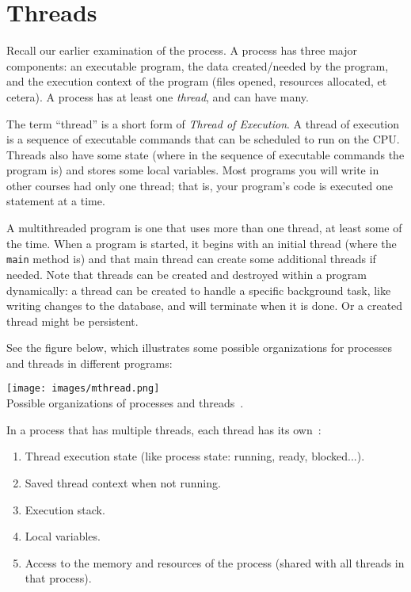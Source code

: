 




\section*{Threads}

Recall our earlier examination of the process. A process has three major components: an executable program, the data created/needed by the program, and the execution context of the program (files opened, resources allocated, et cetera). A process has at least one \textit{thread}, and can have many.

The term ``thread'' is a short form of \textit{Thread of Execution}. A thread of execution is a sequence of executable commands that can be scheduled to run on the CPU. Threads also have some state (where in the sequence of executable commands the program is) and stores some local variables. Most programs you will write in other courses had only one thread; that is, your program's code is executed one statement at a time.

A multithreaded program is one that uses more than one thread, at least some of the time. When a program is started, it begins with an initial thread (where the \texttt{main} method is) and that main thread can create some additional threads if needed. Note that threads can be created and destroyed within a program dynamically: a thread can be created to handle a specific background task, like writing changes to the database, and will terminate when it is done. Or a created thread might be persistent.

See the figure below, which illustrates some possible organizations for processes and threads in different programs:

\begin{center}
	\texttt{[image: images/mthread.png]}\\
	Possible organizations of processes and threads~\cite{mthread}.
\end{center}

In a process that has multiple threads, each thread has its own~\cite{osi}:
\begin{enumerate}
	\item Thread execution state (like process state: running, ready, blocked...).
	\item Saved thread context when not running.
	\item Execution stack.
	\item Local variables.
	\item Access to the memory and resources of the process (shared with all threads in that process).
\end{enumerate}

